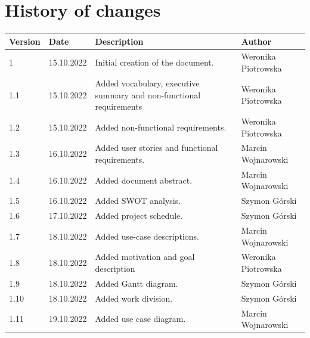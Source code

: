 \documentclass{article}
\begin{document}
\section*{History of changes}
\begin{center}
    \begin{tabular}{ |p{} | p{} | p{} | p{}| }
        \hline
        Version         & Date       & Description                                                          & Author              \\
        \hline
        1               & 15.10.2022 & Initial creation of the document.                                    & Weronika Piotrowska \\
        \hline
        1.1             & 15.10.2022 & Added vocabulary, executive summary and non-functional requirements  & Weronika Piotrowska \\
        \hline
        1.2             & 15.10.2022 & Added non-functional requirements.                                   & Weronika Piotrowska \\
        \hline
        1.3             & 16.10.2022 & Added user stories and functional requirements.                      & Marcin Wojnarowski  \\
        \hline
        1.4             & 16.10.2022 & Added document abstract.                                             & Marcin Wojnarowski  \\
        \hline
        1.5             & 16.10.2022 & Added SWOT analysis.                                                 & Szymon Górski       \\
        \hline
        1.6             & 17.10.2022 & Added project schedule.                                              & Szymon Górski       \\
        \hline
        1.7             & 18.10.2022 & Added use-case descriptions.                                         & Marcin Wojnarowski  \\
        \hline
        1.8             & 18.10.2022 & Added motivation and goal description                                & Weronika Piotrowska \\
        \hline
        1.9             & 18.10.2022 & Added Gantt diagram.                                                 & Szymon Górski       \\
        \hline
        1.10            & 18.10.2022 & Added work division.                                                 & Szymon Górski       \\
        \hline
        1.11            & 19.10.2022 & Added use case diagram.                                              & Marcin Wojnarowski  \\
        \hline


\end{tabular}
\end{center}
\end{document}
